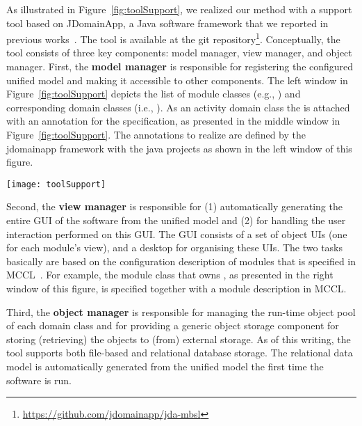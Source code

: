 As illustrated in Figure~\ref{fig:toolSupport}, we realized our method with a support tool based on JDomainApp, a Java software framework that we reported in previous works~\cite{le_domain_2018}. The tool is available at the git repository\footnote{\url{https://github.com/jdomainapp/jda-mbsl}}. %
%
Conceptually, the tool consists of three key components: model manager, view manager, and object manager. First, the \textbf{model manager} is responsible for registering the configured unified model and making it accessible to other components. The left window in Figure~\ref{fig:toolSupport} depicts the list of module classes (e.g., ) and corresponding domain classes (i.e., ). As an activity domain class the  is attached with an annotation  for the \agl specification, as presented in the middle window in Figure~\ref{fig:toolSupport}. The annotations to realize \agl are defined by the jdomainapp framework with the java projects as shown in the left window of this figure. 

\begin{figure*}[ht]
	\centering
	\texttt{[image: toolSupport]}
	\caption{Illustration for the JDomainApp-based realization and usability of \agl.} %
	\label{fig:toolSupport}
\end{figure*}

Second, the \textbf{view manager} is responsible for (1) automatically generating the entire GUI of the software from the unified model and (2) for handling the user interaction performed on this GUI. The GUI consists of a set of object UIs (one for each module's view), and a desktop for organising these UIs. The two tasks basically are based on the configuration description of modules that is specified in MCCL~\cite{le_domain_2018}. For example, the module class  that owns , as presented in the right window of this figure, is specified together with a module description in MCCL.

Third, the \textbf{object manager} is responsible for managing the run-time object pool of each domain class and for providing a generic object storage component for storing (retrieving) the objects to (from) external storage. As of this writing, the tool supports both file-based and relational database storage. The relational data model is automatically generated from the unified model the first time the software is run.

